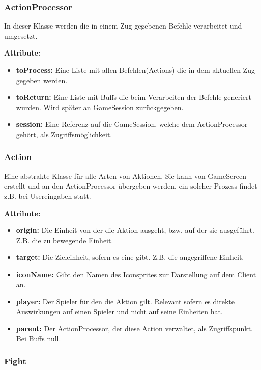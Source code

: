 \documentclass[fontsize=12pt,paper=a4,twoside]{scrartcl}
\begin{document}
\subsubsection{ActionProcessor}

In dieser Klasse werden die in einem Zug gegebenen Befehle verarbeitet und umgesetzt.

\textbf{Attribute:}
\begin{itemize}
\item \textbf{toProcess:} Eine Liste mit allen Befehlen(Actions) die in dem aktuellen Zug gegeben werden.
\item \textbf{toReturn:} Eine Liste mit Buffs die beim Verarbeiten der Befehle generiert wurden. Wird später an GameSession zurückgegeben.
\item \textbf{session:} Eine Referenz auf die GameSession, welche dem ActionProcessor gehört, als Zugriffsmöglichkeit.
\end{itemize}

\subsubsection{Action}

Eine abstrakte Klasse für alle Arten von Aktionen. Sie kann von GameScreen erstellt und an den ActionProcessor übergeben werden, ein solcher Prozess findet z.B. bei Usereingaben statt.

\textbf{Attribute:}
\begin{itemize}
\item \textbf{origin:} Die Einheit von der die Aktion ausgeht, bzw. auf der sie ausgeführt. Z.B. die zu bewegende Einheit.
\item \textbf{target:} Die Zieleinheit, sofern es eine gibt. Z.B. die angegriffene Einheit.
\item \textbf{iconName:} Gibt den Namen des Iconsprites zur Darstellung auf dem Client an.
\item \textbf{player:} Der Spieler für den die Aktion gilt. Relevant sofern es direkte Auswirkungen auf einen Spieler und nicht auf seine Einheiten hat.
\item \textbf{parent:} Der ActionProcessor, der diese Action verwaltet, als Zugriffspunkt. Bei Buffs null.
\end{itemize}

\subsubsection{Fight}
\end{document}
